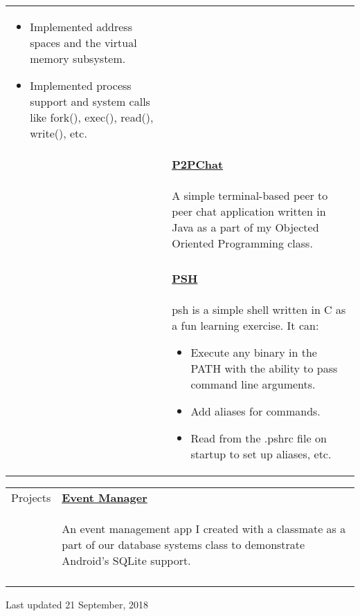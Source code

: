 \documentclass[letterpaper,11pt,oneside]{article}
\begin{document}
\begin{tabularx}{\textwidth}{l X}
    \begin{itemize}[label={--}]
    \setlength\itemsep{-0.25em}
        \item Implemented address spaces and the virtual memory subsystem.
        \item Implemented process support and system calls like fork(), exec(), read(), write(), etc.
    \end{itemize} \\
    \vspace{-1.5ex} & \textbf{\href{https://github.com/prati0100/P2PChat}{P2PChat}} \\
    \vspace{-3ex} & \begin{adjustwidth}{}{}A simple terminal-based peer to peer chat application written in Java as a part of my Objected Oriented Programming class.\end{adjustwidth} \\
    & \\
    & \vspace{-3ex} \textbf{\href{https://github.com/prati0100/psh}{PSH}} \\
    & \vspace{-2.5ex} psh is a simple shell written in C as a fun learning exercise. It can: \vspace{-0.75ex}
    \begin{itemize}[label={--}]
    \setlength\itemsep{-0.25em}
        \item Execute any binary in the PATH with the ability to pass command line arguments.
        \item Add aliases for commands.
        \item Read from the .pshrc file on startup to set up aliases, etc.
    \end{itemize} \\
\end{tabularx}

\noindent \begin{tabularx}{\textwidth}{l X}
\Large{Projects} \vspace{-1.5ex} & \textbf{\href{https://github.com/prati0100/EventManager}{Event Manager}} \\
& \begin{adjustwidth}{}{}An event management app I created with a classmate as a part of our database systems class to demonstrate Android's SQLite support.\end{adjustwidth} \\
    & \\
\end{tabularx}

\centerline{Last updated 21 September, 2018}
\end{document}
